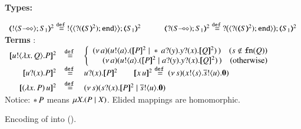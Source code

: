 \begin{figure}[t]
{\bf Types:}

$
	\begin{array}{c}
		\tmap{\btout{\lhot{S}}S_1}{2} \defeq \bbtout{\chtype{\btinp{\tmap{S}{2}}\tinact}}\tmap{S_1}{2}
		\qquad
		\quad
		\tmap{\btinp{\lhot{S}}S_1}{2} \defeq \bbtinp{\chtype{\btinp{\tmap{S}{2}}\tinact}}\tmap{S_1}{2}
	\end{array}
$
\\[2mm]
{\bf Terms} :
\\
$
\begin{array}{rcll}
	\pmap{\bout{u}{\abs{x}{Q}} P}{2} & \defeq  &
	\left\{
	\begin{array}{r}
		\newsp{a}{\bout{u}{a} (\pmap{P}{2} \Par \repl{} \binp{a}{y} \binp{y}{x} \pmap{Q}{2})\,}\quad
		(s \notin \fn{Q})
		\\
		\newsp{a}{\bout{u}{a} (\pmap{P}{2} \Par \binp{a}{y} \binp{y}{x} \pmap{Q}{2})\,}\quad
		\textrm{(otherwise)} %
	\end{array}
	\right.
	\\[1mm]

	\pmap{\binp{u}{x} P}{2} &\defeq&  \binp{u}{x} \pmap{P}{2}
	\qquad
	\pmap{\appl{x}{u}}{2} \defeq \newsp{s}{\bout{x}{s} \bout{\dual{s}}{u} \inact}
	\\[1mm]

	\pmap{\appl{(\abs{x}{P})}{u}}{2} & \defeq & %
	\newsp{s}{\binp{s}{x} \pmap{P}{2} \Par \bout{\dual{s}}{u} \inact}
\end{array}
$
\\[2mm]
{Notice: $\repl{} P$ means $\recp{X}{(P \Par \rvar{X})}$. Elided mappings are homomorphic.}
\caption{Encoding of \HOp into \sessp (). \label{f:enc:ho_to_sessp}}
\end{figure}

